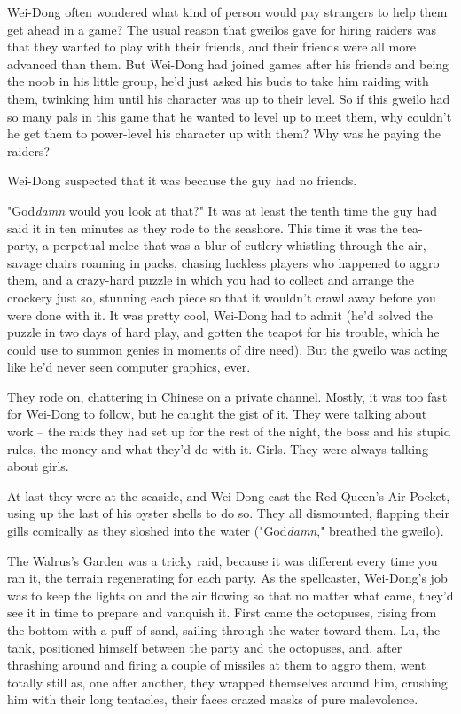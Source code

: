 Wei-Dong often wondered what kind of person would pay strangers to
help them get ahead in a game? The usual reason that gweilos gave
for hiring raiders was that they wanted to play with their friends,
and their friends were all more advanced than them. But Wei-Dong
had joined games after his friends and being the noob in his little
group, he'd just asked his buds to take him raiding with them,
twinking him until his character was up to their level. So if this
gweilo had so many pals in this game that he wanted to level up to
meet them, why couldn't he get them to power-level his character up
with them? Why was he paying the raiders?

Wei-Dong suspected that it was because the guy had no friends.

"God\emph{damn} would you look at that?" It was at least the tenth
time the guy had said it in ten minutes as they rode to the
seashore. This time it was the tea-party, a perpetual melee that
was a blur of cutlery whistling through the air, savage chairs
roaming in packs, chasing luckless players who happened to aggro
them, and a crazy-hard puzzle in which you had to collect and
arrange the crockery just so, stunning each piece so that it
wouldn't crawl away before you were done with it. It was pretty
cool, Wei-Dong had to admit (he'd solved the puzzle in two days of
hard play, and gotten the teapot for his trouble, which he could
use to summon genies in moments of dire need). But the gweilo was
acting like he'd never seen computer graphics, ever.

They rode on, chattering in Chinese on a private channel. Mostly,
it was too fast for Wei-Dong to follow, but he caught the gist of
it. They were talking about work -- the raids they had set up for
the rest of the night, the boss and his stupid rules, the money and
what they'd do with it. Girls. They were always talking about
girls.

At last they were at the seaside, and Wei-Dong cast the Red Queen's
Air Pocket, using up the last of his oyster shells to do so. They
all dismounted, flapping their gills comically as they sloshed into
the water ("God\emph{damn}," breathed the gweilo).

The Walrus's Garden was a tricky raid, because it was different
every time you ran it, the terrain regenerating for each party. As
the spellcaster, Wei-Dong's job was to keep the lights on and the
air flowing so that no matter what came, they'd see it in time to
prepare and vanquish it. First came the octopuses, rising from the
bottom with a puff of sand, sailing through the water toward them.
Lu, the tank, positioned himself between the party and the
octopuses, and, after thrashing around and firing a couple of
missiles at them to aggro them, went totally still as, one after
another, they wrapped themselves around him, crushing him with
their long tentacles, their faces crazed masks of pure
malevolence.

